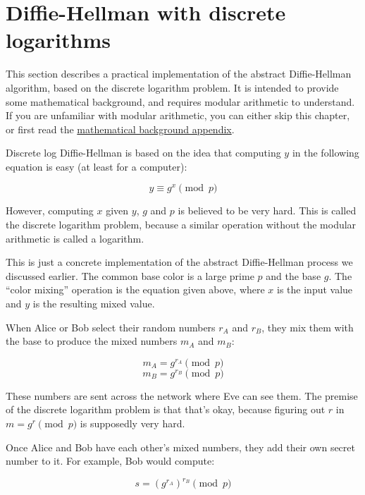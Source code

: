 \documentclass[11pt,ebook,table,dvipsnames]{memoir}
\begin{document}
\section{Diffie-Hellman with discrete logarithms}
\label{sec-2-4-3}

This section describes a practical implementation of the abstract
Diffie-Hellman algorithm, based on the discrete logarithm problem. It
is intended to provide some mathematical background, and requires
modular arithmetic to understand. If you are unfamiliar with modular
arithmetic, you can either skip this chapter, or first read the
\hyperref[Modular-arithmetic]{mathematical background appendix}.

Discrete log Diffie-Hellman is based on the idea that computing $y$ in
the following equation is easy (at least for a computer):

\begin{equation}
y \equiv g^x \pmod{p}
\end{equation}

However, computing $x$ given $y$, $g$ and $p$ is believed to be very
hard. This is called the discrete logarithm problem, because a similar
operation without the modular arithmetic is called a logarithm.

This is just a concrete implementation of the abstract Diffie-Hellman
process we discussed earlier. The common base color is a large prime
$p$ and the base $g$. The \enquote{color mixing} operation is the equation
given above, where $x$ is the input value and $y$ is the resulting
mixed value.

When Alice or Bob select their random numbers $r_A$ and $r_B$, they
mix them with the base to produce the mixed numbers $m_A$ and $m_B$:

\begin{equation}
m_A = g^{r_A} \pmod{p}
\end{equation}
\begin{equation}
m_B = g^{r_B} \pmod{p}
\end{equation}

These numbers are sent across the network where Eve can see them. The
premise of the discrete logarithm problem is that that's okay, because
figuring out $r$ in $m = g^r \pmod{p}$ is supposedly very hard.

Once Alice and Bob have each other's mixed numbers, they add their own
secret number to it. For example, Bob would compute:

\begin{equation}
s = (g^{r_A})^{r_B} \pmod{p}
\end{equation}
\end{document}
